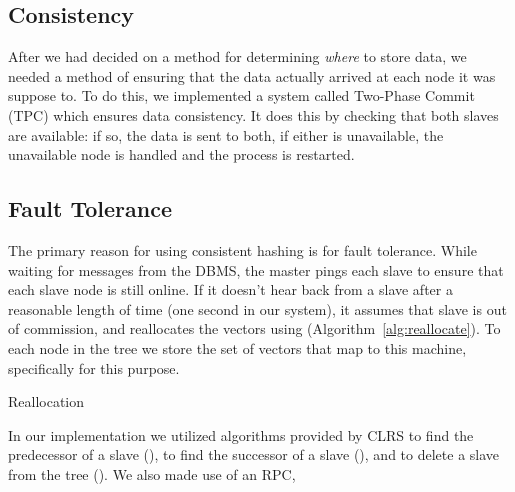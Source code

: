 \subsection{Consistency}
After we had decided on a method for determining \emph{where} to store data,
we needed a method of ensuring that the data actually arrived at each node it
was suppose to. To do this, we implemented a system called Two-Phase Commit
(TPC) which ensures data consistency. It does this by checking that both slaves
are available: if so, the data is sent to both, if either is unavailable, the
unavailable node is handled and the process is restarted.
%
\subsection{Fault Tolerance}
The primary reason for using consistent hashing is for fault tolerance. While
waiting for messages from the DBMS, the master pings each slave to ensure that
each slave node is still online. If it doesn't hear back from a slave after a
reasonable length of time (one second in our system), it assumes that slave is
out of commission, and reallocates the vectors using 
(Algorithm~\ref{alg:reallocate}). To each node in the tree we store the set of
vectors that map to this machine, specifically for this purpose.
%
\begin{algorithm}
    \begin{algorithmic}
            \EndFor
            \EndFor
        \EndProcedure
    \end{algorithmic}
    \caption{Reallocation}
    \label{alg:reallocate}
\end{algorithm}
%
\par
In our implementation we utilized algorithms provided by CLRS \cite{cormen2009}
to find the predecessor of a slave (), to find the
successor of a slave (), and to delete a slave from the
tree (). We also made use of an RPC,
